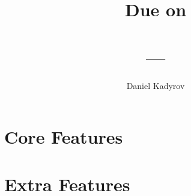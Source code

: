 \documentclass{homework}
\title{
    \Title \\
    \vspace{2mm}
    \large
    Due on \DueDate \\
    \ClassName \\ 
    \ClassNumber ---\ClassSection \\
    \Instructor
}
\author{Daniel Kadyrov}
\date{}
\begin{document}
\maketitle
\thispagestyle{empty}

\section{Core Features}

\section{Extra Features}
\end{document}
